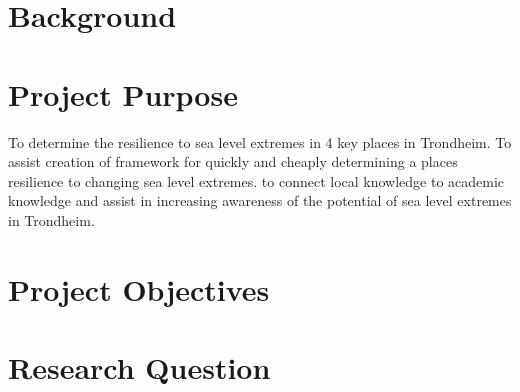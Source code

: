 

\section{Background}





\section{Project Purpose}
To determine the resilience to sea level extremes in 4 key places in Trondheim. To assist creation of framework for quickly and cheaply determining a places resilience to changing sea level extremes. to connect local knowledge to academic knowledge and assist in increasing awareness of the potential of sea level extremes in Trondheim. 

\section{Project Objectives}

\section{Research Question}


